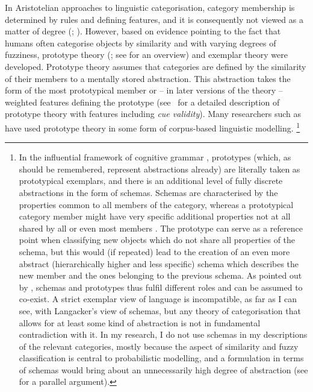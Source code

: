 In Aristotelian approaches to linguistic categorisation, category membership is determined by rules and defining features, and it is consequently not viewed as a matter of degree (\citealt{Sutcliffe1993}; \citealt[11--16]{Murphy2002}).
However, based on evidence pointing to the fact that humans often categorise objects by similarity and with varying degrees of fuzziness, prototype theory (\citealt{Rosch1973}; see \citealt{Taylor2008} for an overview) and exemplar theory \citep{MedinSchaffer1978,Hintzman1986} were developed.
Prototype theory assumes that categories are defined by the similarity of their members to a mentally stored abstraction.
This abstraction takes the form of the most prototypical member or -- in later versions of the theory -- weighted features defining the prototype (see \RAWeakN\ for a detailed description of prototype theory with features including \textit{cue validity}).
Many researchers such as \citet{Gries2003,Gilquin2006,NessetJanda2010,Dobric2015} have used prototype theory in some form of corpus-based linguistic modelling.%
\footnote{In the influential framework of cognitive grammar \citep{Langacker1987}, prototypes (which, as should be remembered, represent abstractions already) are literally taken as prototypical exemplars, and there is an additional level of fully discrete abstractions in the form of schemas.
Schemas are characterised by the properties common to all members of the category, whereas a prototypical category member might have very specific additional properties not at all shared by all or even most members \citep[371-375]{Langacker1987}.
The prototype can serve as a reference point when classifying new objects which do not share all properties of the schema, but this would (if repeated) lead to the creation of an even more abstract (hierarchically higher and less specific) schema which describes the new member and the ones belonging to the previous schema.
As pointed out by \citet[136--137]{Langacker1987}, schemas and prototypes thus fulfil different roles and can be assumed to co-exist.
A strict exemplar view of language is incompatible, as far as I can see, with Langacker's view of schemas, but any theory of categorisation that allows for at least some kind of abstraction is not in fundamental contradiction with it.
In my research, I do not use schemas in my descriptions of the relevant categories, mostly because the aspect of similarity and fuzzy classification is central to probabilistic modelling, and a formulation in terms of schemas would bring about an unnecessarily high degree of abstraction (see \citealt[70--71]{Taylor2003} for a parallel argument).}

